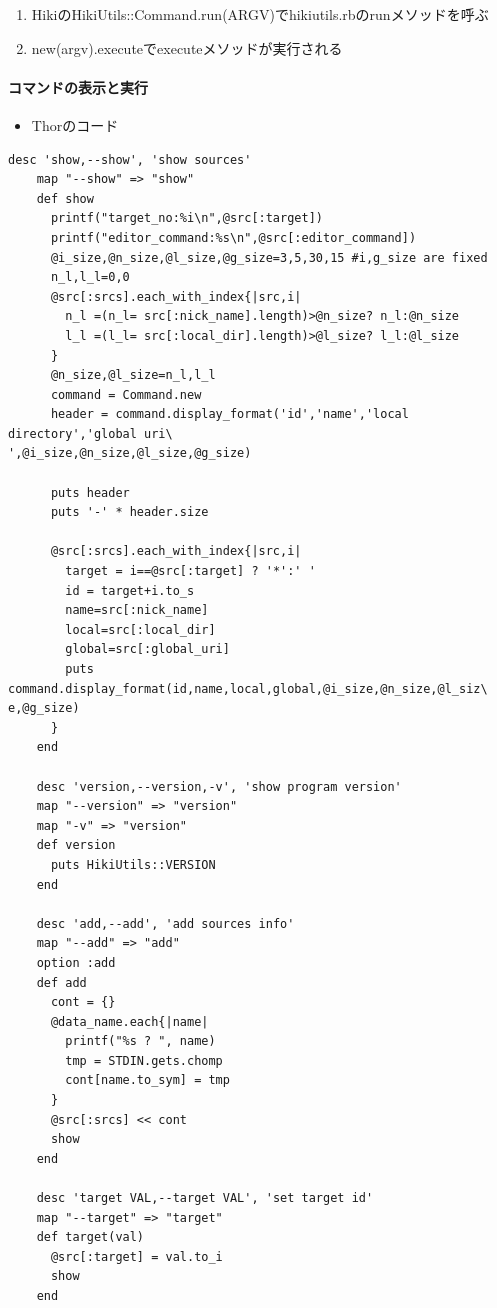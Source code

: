 \begin{enumerate}
\item HikiのHikiUtils::Command.run(ARGV)でhikiutils.rbのrunメソッドを呼ぶ
\item new(argv).executeでexecuteメソッドが実行される
\end{enumerate}
\paragraph{コマンドの表示と実行}
\begin{itemize}
\item Thorのコード
\end{itemize}\begin{lstlisting}[style=customRuby]
    desc 'show,--show', 'show sources'
    map "--show" => "show"
    def show
      printf("target_no:%i\n",@src[:target])
      printf("editor_command:%s\n",@src[:editor_command])
      @i_size,@n_size,@l_size,@g_size=3,5,30,15 #i,g_size are fixed             
      n_l,l_l=0,0
      @src[:srcs].each_with_index{|src,i|
        n_l =(n_l= src[:nick_name].length)>@n_size? n_l:@n_size
        l_l =(l_l= src[:local_dir].length)>@l_size? l_l:@l_size
      }
      @n_size,@l_size=n_l,l_l
      command = Command.new
      header = command.display_format('id','name','local directory','global uri\
',@i_size,@n_size,@l_size,@g_size)

      puts header
      puts '-' * header.size

      @src[:srcs].each_with_index{|src,i|
        target = i==@src[:target] ? '*':' '
        id = target+i.to_s
        name=src[:nick_name]
        local=src[:local_dir]
        global=src[:global_uri]
        puts command.display_format(id,name,local,global,@i_size,@n_size,@l_siz\
e,@g_size)
      }
    end

    desc 'version,--version,-v', 'show program version'
    map "--version" => "version"
    map "-v" => "version"
    def version
      puts HikiUtils::VERSION
    end

    desc 'add,--add', 'add sources info'
    map "--add" => "add"
    option :add
    def add
      cont = {}
      @data_name.each{|name|
        printf("%s ? ", name)
        tmp = STDIN.gets.chomp
        cont[name.to_sym] = tmp
      }
      @src[:srcs] << cont
      show
    end

    desc 'target VAL,--target VAL', 'set target id'
    map "--target" => "target"
    def target(val)
      @src[:target] = val.to_i
      show
    end


\end{lstlisting}
